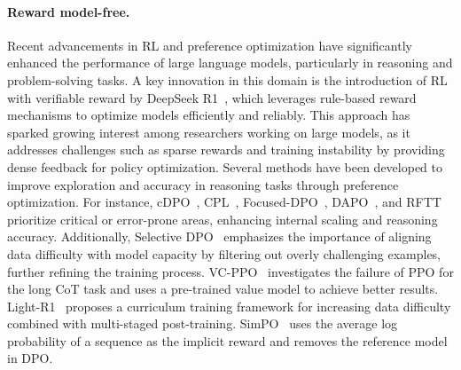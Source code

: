 \paragraph{Reward model-free.} Recent advancements in RL and preference optimization have significantly enhanced the performance of large language models, particularly in reasoning and problem-solving tasks. A key innovation in this domain is the introduction of RL with verifiable reward by DeepSeek R1~\citep{deepseek-r1}, which leverages rule-based reward mechanisms to optimize models efficiently and reliably. This approach has sparked growing interest among researchers working on large models, as it addresses challenges such as sparse rewards and training instability by providing dense feedback for policy optimization.
Several methods have been developed to improve exploration and accuracy in reasoning tasks through preference optimization. For instance, cDPO~\citep{lin2024critical}, CPL~\citep{wang2024cpl}, Focused-DPO~\citep{zhang2025focused}, DAPO~\citep{liu2024improvingmultistepreasoningabilities}, and RFTT~\citep{zhang2025reasoning} prioritize critical or error-prone areas, enhancing internal scaling and reasoning accuracy. Additionally, Selective DPO~\citep{gao2025principled} emphasizes the importance of aligning data difficulty with model capacity by filtering out overly challenging examples, further refining the training process.
VC-PPO~\citep{yuan2025s} investigates the failure of PPO for the long CoT task and uses a pre-trained value model to achieve better results. 
Light-R1~\citep{wen2025lightxi} proposes a curriculum training framework for increasing data difficulty combined with multi-staged post-training. 
SimPO~\citep{meng2024simpo} uses the average log probability of a sequence as the implicit reward and removes the reference model in DPO.

